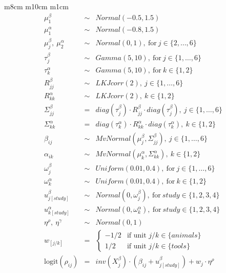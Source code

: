 \documentclass{article}
\begin{document}
\begin{tabular}{ m{8cm} m{10cm} m{1cm}}
\renewcommand{\arraystretch}{1.2}
\[
\begin{array}{rcl}
    \mu_{1}^{\beta} & \sim & Normal(-0.5, 1.5) \\
    \mu_{1}^{\alpha} & \sim & Normal(-0.8, 1.5) \\
    \mu_{j}^{\beta}, \ \mu_{2}^{\alpha} & \sim & Normal(0, 1),\ \mathrm{for}\ j \in \{2, \ldots, 6\} \\
    \tau_{j}^{\beta} & \sim & Gamma(5, 10),\ \mathrm{for}\ j \in \{1, \ldots, 6\} \\
    \tau_{k}^{\alpha} & \sim & Gamma(5, 10),\ \mathrm{for}\ k \in \{1, 2\} \\
    R_{jj}^{\beta} & \sim & LKJcorr(2),\ j \in \{1, \ldots, 6\} \\ 
    R_{kk}^{\alpha} & \sim & LKJcorr(2),\ k \in \{1, 2\}  \\ 
    \Sigma_{jj}^{\beta} & = & diag(\tau_{j}^{\beta}) \cdot R_{jj}^{\beta} \cdot diag(\tau_{j}^{\beta}),\ j \in \{1, \ldots, 6\} \\ 
    \Sigma_{kk}^{\alpha} & = & diag(\tau_{k}^{\alpha}) \cdot R_{kk}^{\alpha} \cdot diag(\tau_{k}^{\alpha}),\ k \in \{1, 2\}  \\ 
    \beta_{ij} & \sim & MvNormal(\mu_j^{\beta}, \Sigma_{jj}^{\beta}),\ j \in \{1, \ldots, 6\} \\
    \alpha_{ik} & \sim & MvNormal(\mu_k^{\alpha}, \Sigma_{kk}^{\alpha}),\ k \in \{1, 2\} \\
    \omega_{j}^{\beta} & \sim & Uniform(0.01, 0.4),\ \mathrm{for}\ j \in \{1, \ldots, 6\} \\
    \omega_{k}^{\alpha} & \sim & Uniform(0.01, 0.4),\ \mathrm{for}\ k \in \{1, 2\} \\
    u_{j[study]}^{\beta} & \sim & Normal(0, \omega_{j}^{\beta}),\ \mathrm{for}\ study \in \{1, 2, 3, 4\} \\
    u_{k[study]}^{\alpha} & \sim & Normal(0, \omega_{k}^{\alpha}),\ \mathrm{for}\ study \in \{1, 2, 3, 4\} \\
    \eta^{\rho},\ \eta^{\gamma} & \sim & Normal(0, 1) \\
    w_{[j/k]} & = & 
    \begin{cases} 
      -1/2 & \text{if unit $j/k$} \in \{animals\} \\ 
      1/2 & \text{if unit $j/k$} \in \{tools\}
    \end{cases}\\ 
    \mathrm{logit}(\rho_{ij}) & = & \mathit{inv}(X_j^{\beta}) \cdot (\beta_{ij} + u_{j[study]}^{\beta}) + w_{j} \cdot \eta^{\rho}\\ 

\end{array}\]
\end{tabular}
\end{document}
